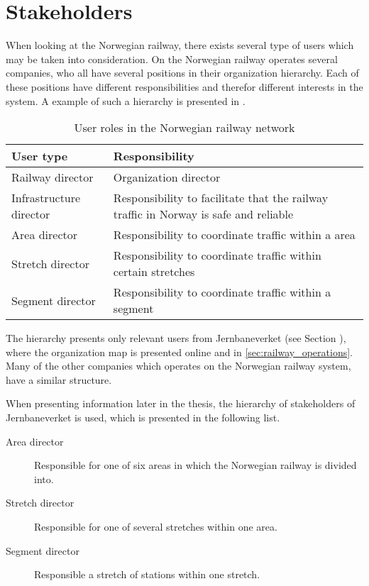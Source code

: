
\clearpage
\section{Stakeholders} %
\label{sec:back_stakeholders}
When looking at the Norwegian railway, there exists several type of users which
may be taken into consideration. On the Norwegian railway operates several
companies, who all have several positions in their organization hierarchy. Each
of these positions have different responsibilities and therefor different
interests in the system. A example of such a hierarchy is presented in
.

\begin{table}[!h]\small
	\begin{tabularx}{\textwidth}{|l|X|}
		\hline
		User type & Responsibility \\
		\hline
		Railway director & Organization director\\
		\hline
		Infrastructure director & Responsibility to facilitate that the railway traffic in Norway is safe and reliable\\
		\hline
		Area director & Responsibility to coordinate traffic within a area\\
		\hline
		Stretch director & Responsibility to coordinate traffic within certain
		stretches\\
		\hline
		Segment director & Responsibility to coordinate traffic within a segment\\
		\hline
	\end{tabularx}
\caption{User roles in the Norwegian railway network}
\label{table:user_roles}
\end{table}

The hierarchy presents only relevant users from Jernbaneverket (see Section
), where the organization map is presented
online\cite{jernbaneverketOrganisasjon}\cite{jernbaneverketInfrastruktdivisjon}
and in \ref{sec:railway_operations}.
Many of the other companies which operates on the Norwegian railway system,
have a similar structure. 

When presenting information later in the thesis, the hierarchy of stakeholders of Jernbaneverket is used, which is presented in the following list.
\begin{description}
	\item [Area director] Responsible for one of six areas in which the 
	Norwegian railway is divided into.
	\item [Stretch director] Responsible for one of several stretches within 
	one area.
	\item [Segment director] Responsible a stretch of stations within one stretch.
\end{description}

